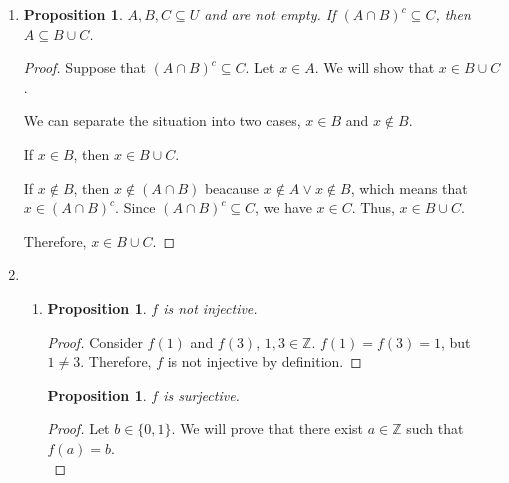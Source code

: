 \documentclass{article}
\newtheorem{prop}[thm]{Proposition}
\begin{document}
\begin{enumerate}
\begin{enumerate}
\begin{proof}
        Since $A \subseteq B$, $x \in B$ because $x \in A$. Therefore, $A, B$ are not disjoint by definition.
    \end{proof}
        
    \item 
    \begin{prop}
        If $A \subseteq B$, then $A, B$ can be disjoint.
    \end{prop}
    \begin{proof}
        Consider $A = \emptyset$. Since an empty set is a subset of all sets, we have $A \subseteq B$. Since $A = \emptyset$, $A, B$ are disjoint, as they do not share any common elements. 
    \end{proof}
\end{enumerate}

\item 
\begin{prop}
    $A, B, C \subseteq U$ and are not empty. If $(A \cap B)^{c} \subseteq C$, then $A \subseteq B \cup C$.
\end{prop}
\begin{proof}
    Suppose that $(A \cap B)^{c} \subseteq C$. Let $x \in A$. We will show that $x \in B \cup C$. 
    
    We can separate the situation into two cases, $x \in B$ and $x \notin B$. 
    
    If $x \in B$, then $x \in B \cup C$.
    
    If $x \notin B$, then $x \notin (A \cap B)$ beacause $x \notin A \vee x \notin B$, which means that $x \in (A \cap B)^{c}$. Since $(A \cap B)^{c} \subseteq C$, we have $x \in C$. Thus, $x \in B \cup C$.
    
    Therefore, $x \in B \cup C$.
\end{proof}

\item \begin{enumerate}
    \item 
    \begin{prop}
      $f$ is not injective.
    \end{prop}
    \begin{proof}
    Consider $f(1)$ and $f(3)$, $1, 3 \in \mathbb{Z}$. $f(1) = f(3) = 1$, but $1 \neq 3$. Therefore, $f$ is not injective by definition.
    \end{proof}
    
    \begin{prop}
      $f$ is surjective.
    \end{prop}
    \begin{proof}
    Let $b \in \{0, 1\}$. We will prove that there exist $a \in \mathbb{Z}$ such that $f(a) = b$. \\
    

\end{proof}
\end{enumerate}
\end{enumerate}
\end{document}
